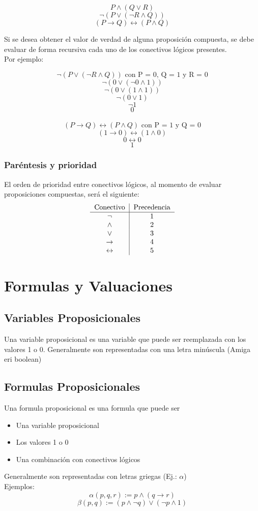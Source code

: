 \documentclass{article}
\begin{document}
$$P \wedge (Q \vee{} R)$$
$$\neg(P \vee (\neg{}R \wedge{} Q))$$
$$(P \rightarrow{} Q) \leftrightarrow{} (P \wedge{} Q)$$



Si se desea obtener el valor de verdad de alguna proposición compuesta, se debe evaluar de forma recursiva cada uno de los conectivos lógicos presentes.\\
Por ejemplo:

$$\neg(P \vee (\neg{} R \wedge{} Q)) \textrm{ con P = 0, Q = 1 y R = 0}$$
$$\neg(0 \vee (\neg{} 0 \wedge{} 1))$$
$$\neg(0 \vee (1 \wedge{} 1))$$
$$\neg(0 \vee 1)$$
$$\neg{}1$$
$$0$$
\\
$$(P \rightarrow{} Q) \leftrightarrow{} (P \wedge{} Q) \text{ con P = 1 y Q = 0}$$
$$(1 \rightarrow{} 0) \leftrightarrow{} (1 \wedge{} 0)$$
$$0 \leftrightarrow{} 0$$
$$1$$

\subsubsection{Paréntesis y prioridad}
El orden de prioridad entre conectivos lógicos, al momento de evaluar proposiciones compuestas, será el siguiente:
\[
    \begin{tabular}{c|c}
        Conectivo & Precedencia\\ \hline
        $\neg$ & 1\\
        $\wedge$ & 2\\
        $\vee$ & 3\\
        $\rightarrow$ & 4\\
        $\leftrightarrow$ & 5
    \end{tabular}
\]

\section{Formulas y Valuaciones}
\subsection{Variables Proposicionales}
Una variable proposicional es una variable que puede ser reemplazada con los valores 1 o 0. Generalmente son representadas con una letra minúscula (Amiga eri boolean)

\subsection{Formulas Proposicionales}
Una formula proposicional es una formula que puede ser
\begin{itemize}
    \item Una variable proposicional
    \item Los valores 1 o 0
    \item Una combinación con conectivos lógicos
\end{itemize}
Generalmente son representadas con letras griegas (Ej.: $\alpha$)\\
Ejemplos:
$$\alpha{}(p,q,r) := p \wedge{}(q \rightarrow{} r)$$
$$\beta{}(p,q) := (p \wedge{} \neg{}q) \vee{} (\neg{}p \wedge{} 1)$$
\end{document}
